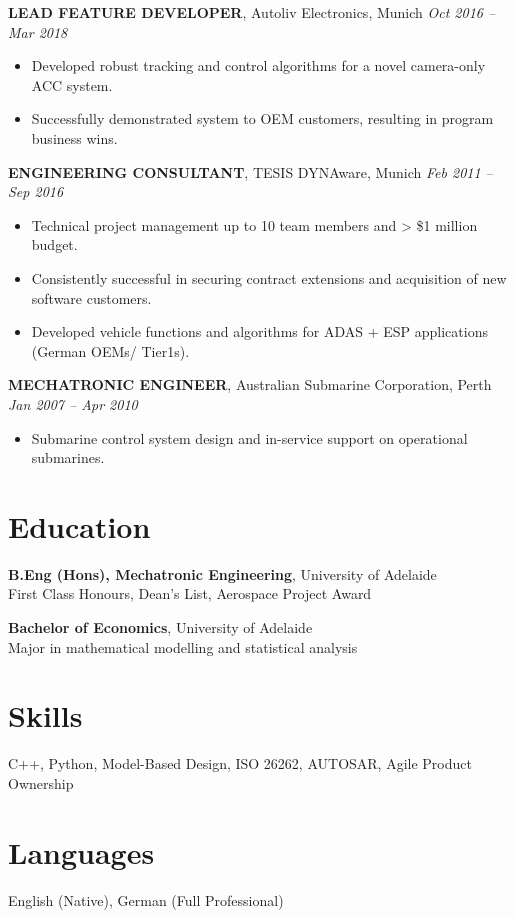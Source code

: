 \documentclass[10pt,a4paper]{article}
\begin{document}
\textbf{LEAD FEATURE DEVELOPER}, Autoliv Electronics, Munich \hfill \textit{Oct 2016 – Mar 2018}\\
\begin{itemize}[leftmargin=*]
    \item Developed robust tracking and control algorithms for a novel camera-only ACC system.
    \item Successfully demonstrated system to OEM customers, resulting in program business wins.
\end{itemize}

\textbf{ENGINEERING CONSULTANT}, TESIS DYNAware, Munich \hfill \textit{Feb 2011 – Sep 2016}\\
\begin{itemize}[leftmargin=*]
    \item Technical project management up to 10 team members and > \$1 million budget.
    \item Consistently successful in securing contract extensions and acquisition of new software customers.
    \item Developed vehicle functions and algorithms for ADAS + ESP applications (German OEMs/ Tier1s).
\end{itemize}

\textbf{MECHATRONIC ENGINEER}, Australian Submarine Corporation, Perth \hfill \textit{Jan 2007 – Apr 2010}\\
\begin{itemize}[leftmargin=*]
    \item Submarine control system design and in-service support on operational submarines.
\end{itemize}

\vspace{0.4cm}

\section*{Education}

\textbf{B.Eng (Hons), Mechatronic Engineering}, University of Adelaide\\
First Class Honours, Dean's List, Aerospace Project Award

\textbf{Bachelor of Economics}, University of Adelaide\\
Major in mathematical modelling and statistical analysis

\vspace{0.4cm}

\section*{Skills}
C++, Python, Model-Based Design, ISO 26262, AUTOSAR, Agile Product Ownership

\vspace{0.4cm}

\section*{Languages}
English (Native), German (Full Professional)
\end{document}
